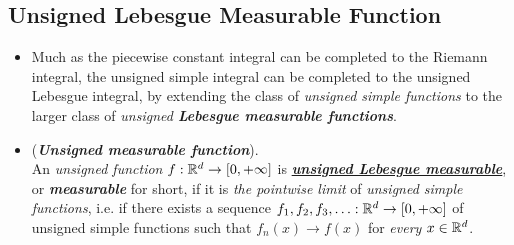 \documentclass[11pt]{article}
\begin{document}
\subsection{Unsigned Lebesgue Measurable Function}
\begin{itemize}
\item \begin{remark}
Much as the piecewise constant integral can be completed to the Riemann integral, the unsigned simple integral can be completed to the unsigned Lebesgue integral, by extending the class of \emph{unsigned simple functions} to the larger class of \emph{unsigned \textbf{Lebesgue measurable functions}}.
\end{remark}

\item \begin{definition}(\emph{\textbf{Unsigned measurable function}}). \\
An \emph{unsigned function} $f : {\mathbb R}^d \rightarrow [0,+\infty]$ is \underline{\emph{\textbf{unsigned Lebesgue measurable}}}, or \emph{\textbf{measurable}} for short, if it is \emph{the pointwise limit} of \emph{unsigned simple functions}, i.e. if there exists a sequence $f_1, f_2, f_3, \ldots : {\mathbb R}^d \rightarrow [0,+\infty]$ of unsigned simple functions such that $f_n(x) \rightarrow f(x)$ for \emph{every} $x \in  {\mathbb R}^d$.
\end{definition}


\end{itemize}
\end{document}
